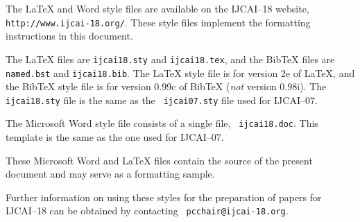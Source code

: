 \documentclass{article}
\theoremstyle{definition}
\begin{document}
The \LaTeX{} and Word style files are available on the IJCAI--18
website, {\tt http://www.ijcai-18.org/}.
These style files implement the formatting instructions in this
document.

The \LaTeX{} files are {\tt ijcai18.sty} and {\tt ijcai18.tex}, and
the Bib\TeX{} files are {\tt named.bst} and {\tt ijcai18.bib}. The
\LaTeX{} style file is for version 2e of \LaTeX{}, and the Bib\TeX{}
style file is for version 0.99c of Bib\TeX{} ({\em not} version
0.98i). The {\tt ijcai18.sty} file is the same as the {\tt
ijcai07.sty} file used for IJCAI--07.

The Microsoft Word style file consists of a single file, {\tt
ijcai18.doc}. This template is the same as the one used for
IJCAI--07.

These Microsoft Word and \LaTeX{} files contain the source of the
present document and may serve as a formatting sample.  

Further information on using these styles for the preparation of
papers for IJCAI--18 can be obtained by contacting {\tt
pcchair@ijcai-18.org}.



\end{document}
